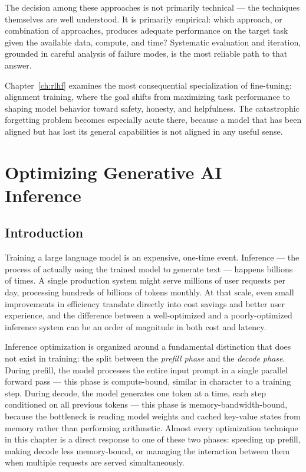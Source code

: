 \documentclass{book}
\begin{document}
The decision among these approaches is not primarily technical --- the
techniques themselves are well understood. It is primarily empirical:
which approach, or combination of approaches, produces adequate
performance on the target task given the available data, compute, and
time? Systematic evaluation and iteration, grounded in careful analysis
of failure modes, is the most reliable path to that answer.

Chapter~\ref{ch:rlhf} examines the most consequential specialization of
fine-tuning: alignment training, where the goal shifts from maximizing
task performance to shaping model behavior toward safety, honesty, and
helpfulness. The catastrophic forgetting problem becomes especially acute
there, because a model that has been aligned but has lost its general
capabilities is not aligned in any useful sense.

\chapter{Optimizing Generative AI Inference}
\label{ch:inference}

\section{Introduction}
\label{sec:inference_intro}

Training a large language model is an expensive, one-time event. Inference
--- the process of actually using the trained model to generate text ---
happens billions of times. A single production system might serve millions
of user requests per day, processing hundreds of billions of tokens monthly.
At that scale, even small improvements in efficiency translate directly into
cost savings and better user experience, and the difference between a
well-optimized and a poorly-optimized inference system can be an order of
magnitude in both cost and latency.

Inference optimization is organized around a fundamental distinction that
does not exist in training: the split between the \emph{prefill phase} and
the \emph{decode phase}. During prefill, the model processes the entire
input prompt in a single parallel forward pass --- this phase is
compute-bound, similar in character to a training step. During decode, the
model generates one token at a time, each step conditioned on all previous
tokens --- this phase is memory-bandwidth-bound, because the bottleneck is
reading model weights and cached key-value states from memory rather than
performing arithmetic. Almost every optimization technique in this chapter
is a direct response to one of these two phases: speeding up prefill,
making decode less memory-bound, or managing the interaction between them
when multiple requests are served simultaneously.
\end{document}
